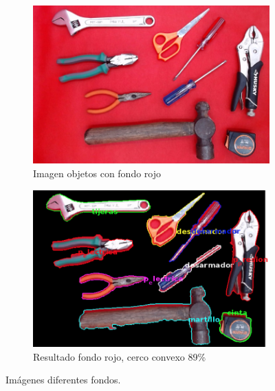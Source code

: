 \documentclass[a4paper, 11pt]{article}
\begin{document}
\begin{figure}[h]
  \begin{subfigure}{0.5\linewidth}
    \includegraphics[width=\linewidth]{resultados_colores/todo_rojo}
    \caption{Imagen objetos con fondo rojo}
    \label{fig:1a}
  \end{subfigure}\hfill
  \begin{subfigure}{0.5\linewidth}
    \includegraphics[width=\linewidth]{resultados_colores/resultado_rojo_cconvexo_0_89}
    \caption{Resultado fondo rojo, cerco convexo 89\%}
    \label{fig:1a}
  \end{subfigure}
  \caption{Imágenes diferentes fondos.}
  \label{fig:1}
\end{figure}
\end{document}
